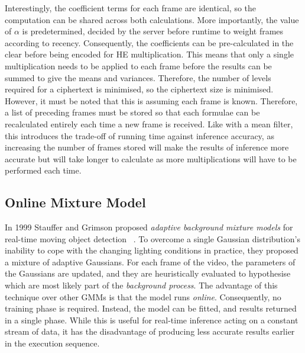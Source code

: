 \indent
Interestingly, the coefficient terms for each frame are identical, so the computation can be shared across both calculations. More importantly, the value of $\alpha$ is predetermined, decided by the server before runtime to weight frames according to recency. Consequently, the coefficients can be pre-calculated in the clear before being encoded for HE multiplication. This means that only a single multiplication needs to be applied to each frame before the results can be summed to give the means and variances. Therefore, the number of levels required for a ciphertext is minimised, so the ciphertext size is minimised.
\smallskip \\ \indent
However, it must be noted that this is assuming each frame is known. Therefore, a list of preceding frames must be stored so that each formulae can be recalculated entirely each time a new frame is received. Like with a mean filter, this introduces the trade-off of running time against inference accuracy, as increasing the number of frames stored will make the results of inference more accurate but will take longer to calculate as more multiplications will have to be performed each time.


\setlength{\leftskip}{0cm}
\subsection{Online Mixture Model}
\label{sec:OMM}
\setlength{\leftskip}{0.5cm}
\indent \indent
In 1999 Stauffer and Grimson proposed \textit{adaptive background mixture models} for real-time moving object detection ~\cite{Stauffer}. To overcome a single Gaussian distribution's inability to cope with the changing lighting conditions in practice, they proposed a mixture of adaptive Gaussians. For each frame of the video, the parameters of the Gaussians are updated, and they are heuristically evaluated to hypothesise which are most likely part of the \textit{background process}. The advantage of this technique over other GMMs is that the model runs \textit{online}. Consequently, no training phase is required. Instead, the model can be fitted, and results returned in a single phase. While this is useful for real-time inference acting on a constant stream of data, it has the disadvantage of producing less accurate results earlier in the execution sequence.

\setlength{\leftskip}{0cm}
